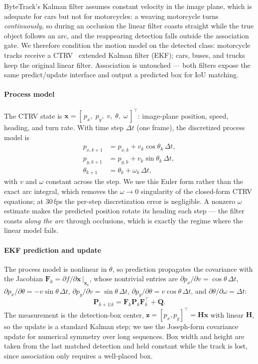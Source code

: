 ByteTrack's Kalman filter assumes constant velocity in the image
plane, which is adequate for cars but not for motorcycles: a weaving
motorcycle turns \emph{continuously}, so during an occlusion the linear
filter coasts straight while the true object follows an arc, and the
reappearing detection falls outside the association gate.
We therefore condition the motion model on the detected class:
motorcycle tracks receive a CTRV~\cite{Schubert2008_ctrv} extended
Kalman filter (EKF); cars, buses, and trucks keep the original linear
filter.
Association is untouched --- both filters expose the same
predict/update interface and output a predicted box for IoU matching.

\paragraph{Process model}
The CTRV state is
$\mathbf{x} = [\,p_x,\; p_y,\; v,\; \theta,\; \omega\,]^\top$:
image-plane position, speed, heading, and turn rate.
With time step $\Delta t$ (one frame), the discretized process model is
\begin{align}
  p_{x,k+1}    &= p_{x,k} + v_k \cos\theta_k \,\Delta t, \label{eq:ctrv_x}\\
  p_{y,k+1}    &= p_{y,k} + v_k \sin\theta_k \,\Delta t, \label{eq:ctrv_y}\\
  \theta_{k+1} &= \theta_k + \omega_k \,\Delta t,        \label{eq:ctrv_theta}
\end{align}
with $v$ and $\omega$ constant across the step.
We use this Euler form rather than the exact arc integral, which
removes the $\omega \to 0$ singularity of the closed-form CTRV
equations; at 30\,fps the per-step discretization error is negligible.
A nonzero $\omega$ estimate makes the predicted position rotate its
heading each step --- the filter coasts \emph{along the arc} through
occlusions, which is exactly the regime where the linear model fails.

\paragraph{EKF prediction and update}
The process model is nonlinear in $\theta$, so prediction propagates
the covariance with the Jacobian
$\mathbf{F}_k = \partial f / \partial \mathbf{x}\,|_{\mathbf{x}_k}$,
whose nontrivial entries are
$\partial p_x / \partial v = \cos\theta\,\Delta t$,
$\partial p_x / \partial \theta = -v\sin\theta\,\Delta t$,
$\partial p_y / \partial v = \sin\theta\,\Delta t$,
$\partial p_y / \partial \theta = v\cos\theta\,\Delta t$, and
$\partial \theta / \partial \omega = \Delta t$:
\begin{equation}
  \mathbf{P}_{k+1|k} = \mathbf{F}_k \mathbf{P}_k \mathbf{F}_k^\top
                       + \mathbf{Q}.
\end{equation}
The measurement is the detection-box center,
$\mathbf{z} = [p_x, p_y]^\top = \mathbf{H}\mathbf{x}$ with linear
$\mathbf{H}$, so the update is a standard Kalman step; we use the
Joseph-form covariance update for numerical symmetry over long
sequences.
Box width and height are taken from the last matched detection and
held constant while the track is lost, since association only requires
a well-placed box.

